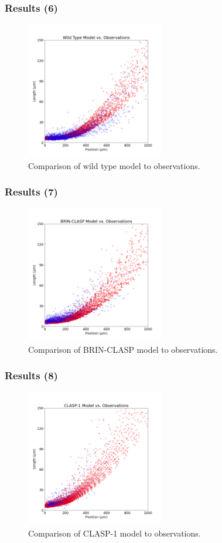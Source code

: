 \documentclass{beamer}
\begin{document}
\begin{frame}
\frametitle{Results (6)}
\begin{figure}
    \centering
    \includegraphics[height=6cm]{column-wild-type.png}
    \caption{Comparison of wild type model to observations.}
\end{figure}
\end{frame}
\begin{frame}
\frametitle{Results (7)}
\begin{figure}
    \centering
    \includegraphics[height=6cm]{column-brin-clasp.png}
    \caption{Comparison of BRIN-CLASP model to observations.}
\end{figure}
\end{frame}
\begin{frame}
\frametitle{Results (8)}
\begin{figure}
    \centering
    \includegraphics[height=6cm]{column-clasp-1.png}
    \caption{Comparison of CLASP-1 model to observations.}
\end{figure}
\end{frame}
\end{document}
